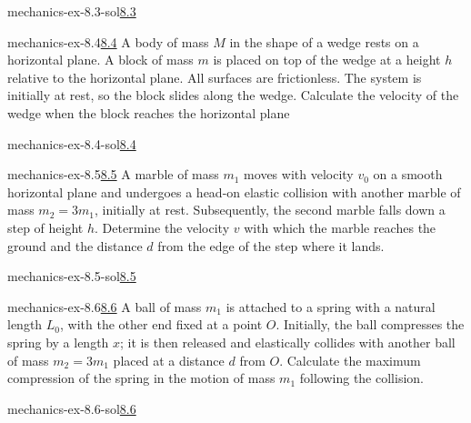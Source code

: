 \documentclass[preview]{standalone}
\begin{document}
\begin{snippetsolution}{mechanics-ex-8.3-sol}{\underline{8.3}}
    \todo
\end{snippetsolution}

\begin{snippetexercise}{mechanics-ex-8.4}{\underline{8.4}}
    A body of mass \(M\) in the shape of a wedge rests on a horizontal plane.
    A block of mass \(m\) is placed on top of the wedge at a height \(h\) relative to the horizontal plane.
    All surfaces are frictionless.
    The system is initially at rest, so the block slides along the wedge.
    Calculate the velocity of the wedge when the block reaches the horizontal plane
\end{snippetexercise}

\begin{snippetsolution}{mechanics-ex-8.4-sol}{\underline{8.4}}
    \todo
\end{snippetsolution}

\begin{snippetexercise}{mechanics-ex-8.5}{\underline{8.5}}
    A marble of mass \(m_1\) moves with velocity \(v_0\) on a smooth horizontal plane and undergoes
    a head-on elastic collision with another marble of mass \(m_2 = 3m_1\), initially at rest.
    Subsequently, the second marble falls down a step of height \(h\).
    Determine the velocity \(v\) with which the marble reaches the ground and the distance \(d\)
    from the edge of the step where it lands.
\end{snippetexercise}

\begin{snippetsolution}{mechanics-ex-8.5-sol}{\underline{8.5}}
    \todo
\end{snippetsolution}

\begin{snippetexercise}{mechanics-ex-8.6}{\underline{8.6}}
    A ball of mass \(m_1\) is attached to a spring with a natural length \(L_0\),
    with the other end fixed at a point \(O\).
    Initially, the ball compresses the spring by a length \(x\); it is then released and elastically
    collides with another ball of mass \(m_2 = 3m_1\) placed at a distance \(d\) from \(O\).
    Calculate the maximum compression of the spring in the motion of mass \(m_1\) following the collision.
\end{snippetexercise}

\begin{snippetsolution}{mechanics-ex-8.6-sol}{\underline{8.6}}
    \todo
\end{snippetsolution}
\end{document}
